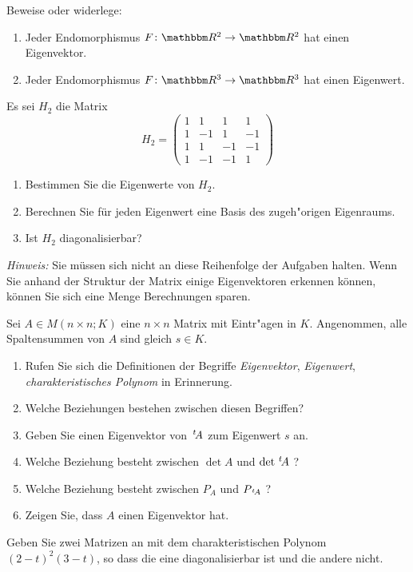 \documentclass[a4,11pt]{article}
\begin{document}
\vspace*{-17mm}
{
\kopf
}


\begin{aufgabe}[4 Punkte]
  Beweise oder widerlege:
  \begin{enumerate}
  \item Jeder Endomorphismus $F \colon \R^2 \to \R^2$ hat einen
    Eigenvektor.
  \item Jeder Endomorphismus $F \colon \R^3 \to \R^3$ hat einen
    Eigenwert.
  \end{enumerate}
\end{aufgabe}

\begin{aufgabe}[Bonus]
Es sei $H_2$ die Matrix
\[
H_2 = \begin{pmatrix}
1 & 1 & 1 & 1\\
1 & -1 & 1 & -1\\
1 & 1 & -1 & -1\\
1 & -1 & -1 & 1
\end{pmatrix}
\]
\begin{enumerate}
\item Bestimmen Sie die Eigenwerte von $H_2$.
\item Berechnen Sie für jeden Eigenwert eine Basis des zugeh"origen Eigenraums.
\item Ist $H_2$ diagonalisierbar?
\end{enumerate}

\emph{Hinweis:} Sie müssen sich nicht an diese Reihenfolge der
Aufgaben halten. Wenn Sie anhand der Struktur der Matrix einige
Eigenvektoren erkennen können, können Sie sich eine Menge Berechnungen
sparen.
\end{aufgabe}

\begin{aufgabe}[4 Punkte]
Sei $A \in M(n \times n ; K)$ eine $n \times n$ Matrix mit Eintr"agen in $K$.
Angenommen, alle Spaltensummen von $A$ sind gleich $s \in K$.

\begin{enumerate}
\item Rufen Sie sich die Definitionen der Begriffe \emph{Eigenvektor},
  \emph{Eigenwert}, \emph{charakteristisches Polynom} in Erinnerung.
\item Welche Beziehungen bestehen zwischen diesen Begriffen?
\item Geben Sie einen Eigenvektor von $\,^t\!A$ zum Eigenwert $s$ an.
\item Welche Beziehung besteht zwischen $\det A$ und $\det \,^t\!A$ ?
\item Welche Beziehung besteht zwischen $P_A$ und $P_{\,^t\!A}$ ?
\item Zeigen Sie, dass $A$ einen Eigenvektor hat.
\end{enumerate}

\end{aufgabe}

\begin{aufgabe}
  Geben Sie zwei Matrizen an mit dem charakteristischen Polynom
  $(2-t)^2(3-t)$, so dass die eine diagonalisierbar ist und die andere
  nicht.
\end{aufgabe}
\end{document}
